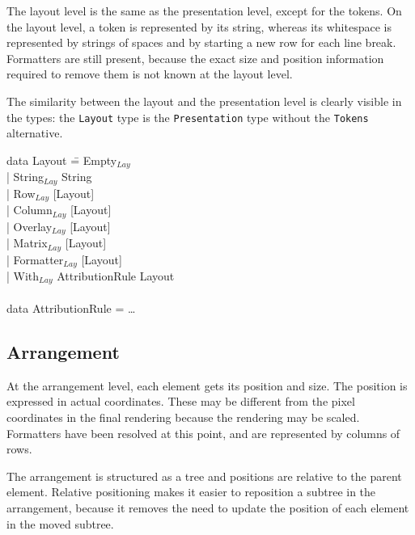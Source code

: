 The layout level is the same as the presentation level, except for the tokens. On the layout level, a token is represented by its string, whereas its whitespace is represented by strings of spaces and by starting a new row for each line break. Formatters are still present, because the exact size and position information required to remove them is not known at the layout level.

The similarity between the layout and the presentation level is clearly visible in the types: the {\tt Layout} type is the {\tt Presentation} type without the {\tt Tokens} alternative.

\noindent
\ttfamily
\begin{tabbing}
data Layout \= = Empty$_{Lay}$\\
            \> | String$_{Lay}$ String \\
            \> | Row$_{Lay}$ [Layout]\\
            \> | Column$_{Lay}$ [Layout]\\
            \> | Overlay$_{Lay}$ [Layout]\\
            \> | Matrix$_{Lay}$ [Layout]\\
            \> | Formatter$_{Lay}$ [Layout]\\
            \> | With$_{Lay}$ AttributionRule Layout\\
\\
data AttributionRule = \dots\\
\end{tabbing}
\rmfamily


%																
\subsection{Arrangement}

At the arrangement level, each element gets its position and size. The position is expressed in actual coordinates. These may be different from the pixel coordinates in the final rendering because the rendering may be scaled. Formatters have been resolved at this point, and are represented by columns of rows.


The arrangement is structured as a tree and positions are relative to the parent element. Relative positioning makes it easier to reposition a subtree in the arrangement, because it removes the need to update the position of each element in the moved subtree. 

